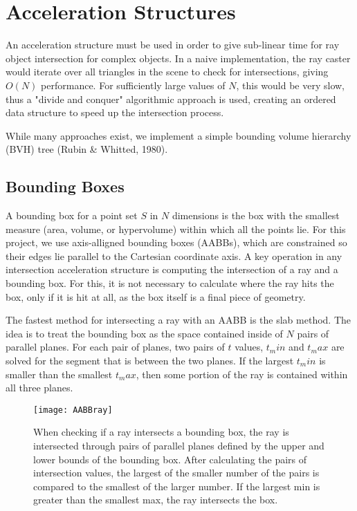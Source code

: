 \section{Acceleration Structures}

An acceleration structure must be used in order to give sub-linear time for ray object intersection for complex objects.
In a naive implementation, the ray caster would iterate over all triangles in the scene to check for intersections, giving $O(N)$ performance.
For sufficiently large values of $N$, this would be very slow, thus a "divide and conquer" algorithmic approach is used, creating an ordered data structure to speed up the intersection process.

While many approaches exist, we implement a simple bounding volume hierarchy (BVH) tree (Rubin \& Whitted, 1980).

\subsection{Bounding Boxes}

A bounding box for a point set $S$ in $N$ dimensions is the box with the smallest measure (area, volume, or hypervolume) within which all the points lie.
For this project, we use axis-alligned bounding boxes (AABBs), which are constrained so their edges lie parallel to the Cartesian coordinate axis.
A key operation in any intersection acceleration structure is computing the intersection of a ray and a bounding box.
For this, it is not necessary to calculate where the ray hits the box, only if it is hit at all, as the box itself is a final piece of geometry.

The fastest method for intersecting a ray with an AABB is the slab method.
The idea is to treat the bounding box as the space contained inside of $N$ pairs of parallel planes.
For each pair of planes, two pairs of $t$ values, $t_min$ and $t_max$ are solved for the segment that is between the two planes.
If the largest $t_min$ is smaller than the smallest $t_max$, then some portion of the ray is contained within all three planes.

\begin{figure}
\texttt{[image: AABBray]}
\caption[AABB Intersection]{When checking if a ray intersects a bounding box, the ray is intersected through pairs of parallel planes defined by the upper and lower bounds of the bounding box. After calculating the pairs of intersection values, the largest of the smaller number of the pairs is compared to the smallest of the larger number. If the largest min is greater than the smallest max, the ray intersects the box.}
\end{figure}

